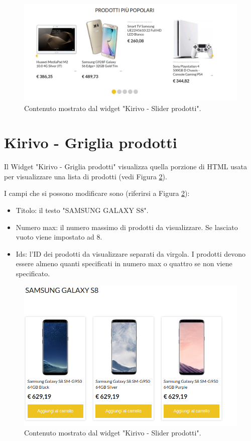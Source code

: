 \begin{figure}
  \includegraphics[width=\textwidth]{figure/kslide.png}
  \caption{Contenuto mostrato dal widget "Kirivo - Slider prodotti".}
  \label{fig:kslide}
\end{figure}



\newpage
\section{Kirivo - Griglia prodotti}
Il Widget "Kirivo - Griglia prodotti"   visualizza quella porzione di HTML usata
per visualizzare una lista di prodotti (vedi Figura \ref{fig:wrenderk}).

I campi che si possono modificare sono (riferirsi a Figura \ref{fig:wrenderk}):
\begin{itemize}
\item Titolo: il testo "SAMSUNG GALAXY S8".
\item Numero max: il numero massimo di prodotti da visualizzare. Se lasciato vuoto viene impostato ad 8.
\item Ids: l'ID dei prodotti da visualizzare separati da virgola. I prodotti devono
essere almeno quanti specificati in numero max o quattro se non viene specificato.
\end{itemize}


\begin{figure}
  \includegraphics[width=\textwidth]{figure/sms-render.png}
  \caption{Contenuto mostrato dal widget "Kirivo - Slider prodotti".}
  \label{fig:wrenderk}
\end{figure}